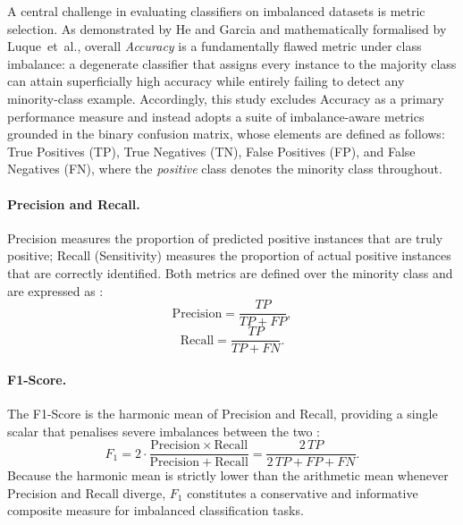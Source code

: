 \documentclass[sigconf]{acmart}
\begin{document}
A central challenge in evaluating classifiers on imbalanced datasets is
metric selection.
As demonstrated by He and Garcia \cite{1} and mathematically
formalised by Luque~et~al.\cite{5}, overall \emph{Accuracy}
is a fundamentally flawed metric under class imbalance: a degenerate
classifier that assigns every instance to the majority class can attain
superficially high accuracy while entirely failing to detect any
minority-class example.
Accordingly, this study excludes Accuracy as a primary performance measure
and instead adopts a suite of imbalance-aware metrics grounded in the binary
confusion matrix, whose elements are defined as follows: True Positives
(TP), True Negatives (TN), False Positives (FP), and False Negatives (FN),
where the \emph{positive} class denotes the minority class throughout.

\paragraph{Precision and Recall.}
Precision measures the proportion of predicted positive instances that are
truly positive; Recall (Sensitivity) measures the proportion of actual
positive instances that are correctly identified.
Both metrics are defined over the minority class and are expressed
as \cite{34}:
%
\begin{equation}
  \mathrm{Precision} = \frac{TP}{TP + FP},
  \label{eq:precision}
\end{equation}
%
\begin{equation}
  \mathrm{Recall} = \frac{TP}{TP + FN}.
  \label{eq:recall}
\end{equation}

\paragraph{F1-Score.}
The F1-Score is the harmonic mean of Precision and Recall, providing a
single scalar that penalises severe imbalances between the
two \cite{35}:
%
\begin{equation}
  F_1
    = 2 \cdot \frac{\mathrm{Precision} \times \mathrm{Recall}}
                   {\mathrm{Precision} + \mathrm{Recall}}
    = \frac{2\,TP}{2\,TP + FP + FN}.
  \label{eq:f1}
\end{equation}
%
Because the harmonic mean is strictly lower than the arithmetic mean
whenever Precision and Recall diverge, $F_1$ constitutes a conservative and
informative composite measure for imbalanced classification tasks.
\end{document}

